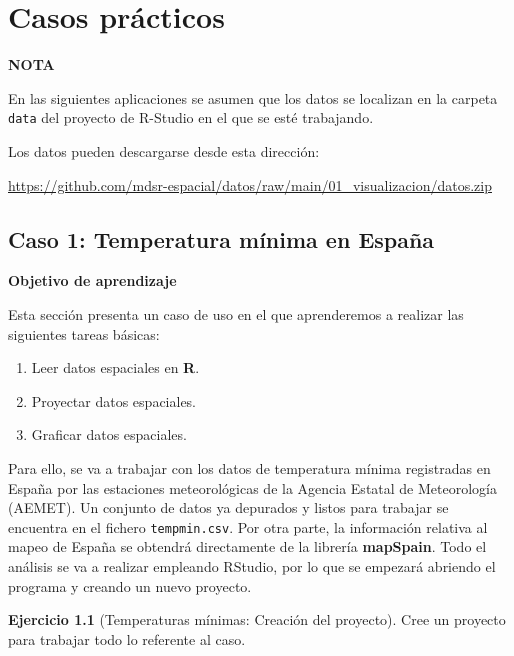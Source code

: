 \documentclass[
]{book}
\theoremstyle{definition}
\theoremstyle{definition}
\theoremstyle{definition}
\newtheorem{exercise}{Ejercicio}[chapter]
\theoremstyle{definition}
\theoremstyle{remark}
\begin{document}
\hypertarget{casos}{%
\chapter{Casos prácticos}\label{casos}}

\begin{infobox}
\textbf{NOTA}

En las siguientes aplicaciones se asumen que los datos se localizan en la
carpeta \texttt{data} del proyecto de R-Studio en el que se esté trabajando.

Los datos pueden descargarse desde esta dirección:

\url{https://github.com/mdsr-espacial/datos/raw/main/01_visualizacion/datos.zip}

\end{infobox}

\hypertarget{tempmin}{%
\section{Caso 1: Temperatura mínima en España}\label{tempmin}}

\textbf{Objetivo de aprendizaje}

Esta sección presenta un caso de uso en el que aprenderemos a realizar las
siguientes tareas básicas:

\begin{enumerate}
\def\labelenumi{\arabic{enumi}.}
\item
  Leer datos espaciales en \textbf{R}.
\item
  Proyectar datos espaciales.
\item
  Graficar datos espaciales.
\end{enumerate}

Para ello, se va a trabajar con los datos de temperatura mínima registradas en
España por las estaciones meteorológicas de la Agencia Estatal de Meteorología
(AEMET). Un conjunto de datos ya depurados y listos para trabajar se encuentra
en el fichero \texttt{tempmin.csv}. Por otra parte, la información relativa al mapeo de
España se obtendrá directamente de la librería \textbf{mapSpain}. Todo el análisis se
va a realizar empleando RStudio, por lo que se empezará abriendo el programa y
creando un nuevo proyecto.

\begin{exercise}[Temperaturas mínimas: Creación del proyecto]
\protect\hypertarget{exr:ex-crea}{}\label{exr:ex-crea}Cree un proyecto para trabajar todo lo referente al caso.
\end{exercise}
\end{document}
